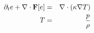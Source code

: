 \begin{eqnarray*}
\partial_t e + \nabla\cdot {\bf F}[e]&=&\nabla \cdot (\kappa \nabla T) \\
                           T&=&\frac{p}{\rho}
\end{eqnarray*}
